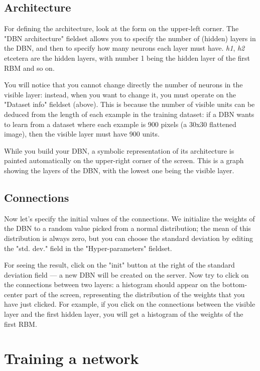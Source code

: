 \documentclass[a4paper]{article}
\begin{document}
		
	\subsection{Architecture}

		
For defining the architecture, look at the form on the upper-left corner. The "DBN architecture" fieldset allows you to specify the number of (hidden) layers in the DBN, and then to specify how many neurons each layer must have. \emph{h1}, \emph{h2} etcetera are the hidden layers, with number 1 being the hidden layer of the first RBM and so on.
		
You will notice that you cannot change directly the number of neurons in the visible layer: instead, when you want to change it, you must operate on the "Dataset info" fieldset (above). This is because the number of visible units can be deduced from the length of each example in the training dataset: if a DBN wants to learn from a dataset where each example is 900 pixels (a 30x30 flattened image), then the visible layer must have 900 units.
		
While you build your DBN, a symbolic representation of its architecture is painted automatically on the upper-right corner of the screen. This is a graph showing the layers of the DBN, with the lowest one being the visible layer.

		
	\subsection{Connections}

		
Now let's specify the initial values of the connections. We initialize the weights of the DBN to a random value picked from a normal distribution; the mean of this distribution is always zero, but you can choose the standard deviation by editing the "std. dev." field in the "Hyper-parameters" fieldset.
		
For seeing the result, click on the "init" button at the right of the standard deviation field --- a new DBN will be created on the server. Now try to click on the connections between two layers: a histogram should appear on the bottom-center part of the screen, representing the distribution of the weights that you have just clicked. For example, if you click on the connections between the visible layer and the first hidden layer, you will get a histogram of the weights of the first RBM.
	


		
	\section{Training a network}
\end{document}
